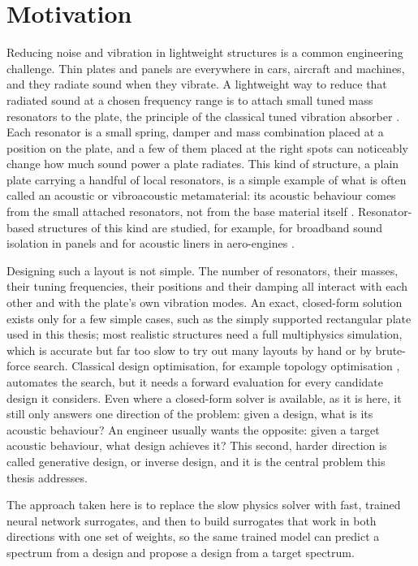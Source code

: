 \section{Motivation}

Reducing noise and vibration in lightweight structures is a common engineering challenge. Thin plates and panels are everywhere in cars, aircraft and machines, and they radiate sound when they vibrate. A lightweight way to reduce that radiated sound at a chosen frequency range is to attach small tuned mass resonators to the plate, the principle of the classical tuned vibration absorber \parencite{denhartog1956vibrations}. Each resonator is a small spring, damper and mass combination placed at a position on the plate, and a few of them placed at the right spots can noticeably change how much sound power a plate radiates. This kind of structure, a plain plate carrying a handful of local resonators, is a simple example of what is often called an acoustic or vibroacoustic metamaterial: its acoustic behaviour comes from the small attached resonators, not from the base material itself \parencite{liu2000locally}. Resonator-based structures of this kind are studied, for example, for broadband sound isolation in panels \parencite{lu2020membrane} and for acoustic liners in aero-engines \parencite{neubauer2023liner}.

Designing such a layout is not simple. The number of resonators, their masses, their tuning frequencies, their positions and their damping all interact with each other and with the plate's own vibration modes. An exact, closed-form solution exists only for a few simple cases, such as the simply supported rectangular plate used in this thesis; most realistic structures need a full multiphysics simulation, which is accurate but far too slow to try out many layouts by hand or by brute-force search. Classical design optimisation, for example topology optimisation \parencite{bendsoe2004topology}, automates the search, but it needs a forward evaluation for every candidate design it considers. Even where a closed-form solver is available, as it is here, it still only answers one direction of the problem: given a design, what is its acoustic behaviour? An engineer usually wants the opposite: given a target acoustic behaviour, what design achieves it? This second, harder direction is called generative design, or inverse design, and it is the central problem this thesis addresses.

The approach taken here is to replace the slow physics solver with fast, trained neural network surrogates, and then to build surrogates that work in both directions with one set of weights, so the same trained model can predict a spectrum from a design and propose a design from a target spectrum.

